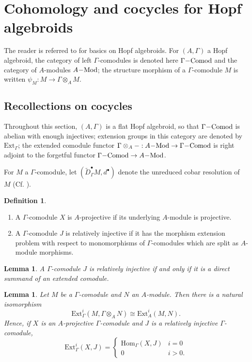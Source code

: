 \documentclass[10pt,a4paper]{amsart}
\newtheorem{lem}[thm]{Lemma}
\theoremstyle{definition}
\newtheorem{defn}[thm]{Definition}
\theoremstyle{remark}
\newcommand{\dash}{\hspace{-.2em}-\hspace{-.2em}}
\newcommand{\cobar}{\tilde{D}}
\renewcommand{\hom}{\mathrm{Hom}}
\newcommand{\ext}{\mathrm{Ext}}
\newcommand{\modules}{\mathrm{Mod}}
\newcommand{\comod}{\mathrm{Comod}}
\begin{document}
\appendix
%
\section{Cohomology and cocycles for Hopf algebroids}
\label{sect:cohom}

The reader is referred to  \cite[Appendix A2]{ravenel_green} for basics on Hopf algebroids.
For $(A,\Gamma)$  a Hopf algebroid, the category of left $\Gamma$-comodules is denoted here $\Gamma \dash \comod$ and the category of $A$-modules  $A\dash \modules$; the structure morphism of a $\Gamma$-comodule $M$ is written $\psi_M : M \rightarrow \Gamma \otimes_A M$.

\subsection{Recollections on cocycles}
\label{subsect:cocycles}

Throughout this section, $(A,\Gamma)$ is a flat Hopf algebroid, so that $\Gamma \dash \comod$ is abelian with enough injectives; extension groups in this category are denoted by $\ext_\Gamma$;  the extended comodule functor $\Gamma \otimes _A - : A\dash \modules \rightarrow \Gamma \dash \comod$ is right adjoint to the forgetful functor $\Gamma \dash \comod \rightarrow A \dash \modules$.

For $M$  a $\Gamma$-comodule, let $(\cobar_\Gamma ^\bullet M, d^\bullet)$
denote  the unreduced cobar resolution of $M$ (Cf. \cite[Definition A1.2.11]{ravenel_green}).

\begin{defn}
\
\begin{enumerate}
	\item
A $\Gamma$-comodule $X$ is $A$-projective if its underlying $A$-module is projective.
\item
	A $\Gamma$-comodule $J$ is relatively injective if it has the morphism extension problem
with respect to monomorphisms of $\Gamma$-comodules which are split as $A$-module morphisms.
\end{enumerate}
\end{defn}

\begin{lem}
	A $\Gamma$-comodule $J$ is relatively injective if and only if it is a direct summand of an extended comodule.
\end{lem}

\begin{lem}
\label{lem:ext_vanishing}
	Let $M$ be a $\Gamma$-comodule and $N$ an $A$-module. Then there is a natural isomorphism
\[
	\ext^i _\Gamma (M, \Gamma \otimes _A N )
\cong
\ext^i _A (M, N) .
\]
Hence, if $X$ is an $A$-projective $\Gamma$-comodule and $J$ is a relatively injective $\Gamma$-comodule,
\[
	\ext^i _\Gamma(X, J) = \left\{ \begin{array}{ll}
	                               	\hom_\Gamma (X, J) & i= 0
\\
0
& i >0.
	                               \end{array}
\right.
\]
\end{lem}
\end{document}
